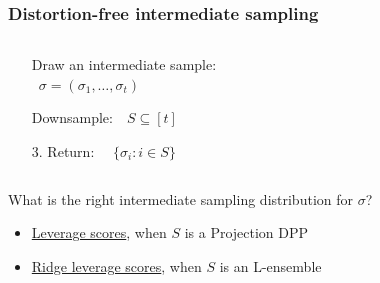 \documentclass[handout]{beamer}
\begin{document}
\begin{frame}
  \frametitle{Distortion-free intermediate sampling}  
  \begin{columns}
    \begin{column}{0.55\textwidth}
  \begin{enumerate}
  \item[\Blue{1.}] Draw an intermediate sample:\\[-1mm]
    ~\hfill $\sigma=(\sigma_1,\dots,\sigma_t)$
  \item[\Red{2.}] Downsample: \ \,$S\subseteq[t]$
\item[3.] Return: \qquad\ \ $\{\sigma_i:i\in S\}$
  \end{enumerate}
\end{column}
\begin{column}{0.45\textwidth}
  \begin{center}
\end{center}
\end{column}
\end{columns}
\pause
\vspace{10mm}

What is the right intermediate sampling distribution for $\sigma$?\pause
\begin{itemize}
  \item \underline{Leverage scores}, when $S$ is a Projection DPP\pause
  \item \underline{Ridge leverage scores}, when $S$ is an L-ensemble
\end{itemize}
\end{frame}
\end{document}
